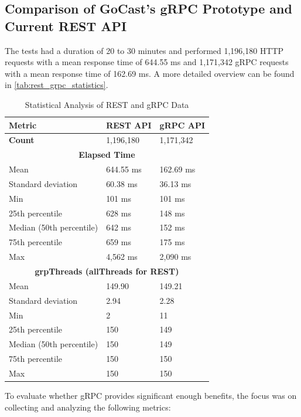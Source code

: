 \subsection{Comparison of GoCast's gRPC Prototype and Current REST API}
The tests had a duration of 20 to 30 minutes and performed 1,196,180 HTTP requests with a mean response time of 644.55 ms and 1,171,342 gRPC requests with a mean response time of 162.69 ms. A more detailed overview can be found in \autoref{tab:rest_grpc_statistics}.

\begin{table}[htbp]
\centering
\caption{Statistical Analysis of REST and gRPC Data}
\label{tab:rest_grpc_statistics}
\begin{tabular}{|l|l|l|}
\hline
\textbf{Metric} & \textbf{REST \ac{API}} & \textbf{gRPC \ac{API}} \\ \hline
\textbf{Count} & 1,196,180 & 1,171,342 \\ \hline
\multicolumn{3}{|c|}{\textbf{Elapsed Time}} \\ \hline
Mean & 644.55 ms & 162.69 ms \\ \hline
Standard deviation & 60.38 ms & 36.13 ms \\ \hline
Min & 101 ms & 101 ms \\ \hline
25th percentile & 628 ms & 148 ms \\ \hline
Median (50th percentile) & 642 ms & 152 ms \\ \hline
75th percentile & 659 ms & 175 ms \\ \hline
Max & 4,562 ms & 2,090 ms \\ \hline
\multicolumn{3}{|c|}{\textbf{grpThreads (allThreads for REST)}} \\ \hline
Mean & 149.90 & 149.21 \\ \hline
Standard deviation & 2.94 & 2.28 \\ \hline
Min & 2 & 11 \\ \hline
25th percentile & 150 & 149 \\ \hline
Median (50th percentile) & 150 & 149 \\ \hline
75th percentile & 150 & 150 \\ \hline
Max & 150 & 150 \\ \hline
\end{tabular}
\end{table}

\noindent To evaluate whether gRPC provides significant enough benefits, the focus was on collecting and analyzing the following metrics:

